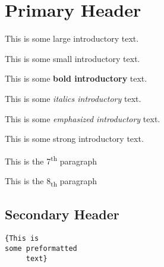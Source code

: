 
\section{Primary Header}
\begin{paragraph}
This is some {\Large large introductory} text.\end{paragraph}
\begin{paragraph}
This is some {\scriptsize small introductory} text.\end{paragraph}
\begin{paragraph}
This is some \textbf{bold introductory} text.\end{paragraph}
\begin{paragraph}
This is some \textit{italics introductory} text.\end{paragraph}
\begin{paragraph}
This is some \emph{emphasized introductory} text.\end{paragraph}
\begin{paragraph}
This is some \textmd{strong introductory} text.\end{paragraph}
\begin{paragraph}
This is the 7\textsuperscript{th} paragraph\end{paragraph}
\begin{paragraph}
This is the 8\textsubscript{th} paragraph\end{paragraph}
\subsection{Secondary Header}

\begin{verbatim}
{This is
some preformatted
     text}
\end{verbatim}
